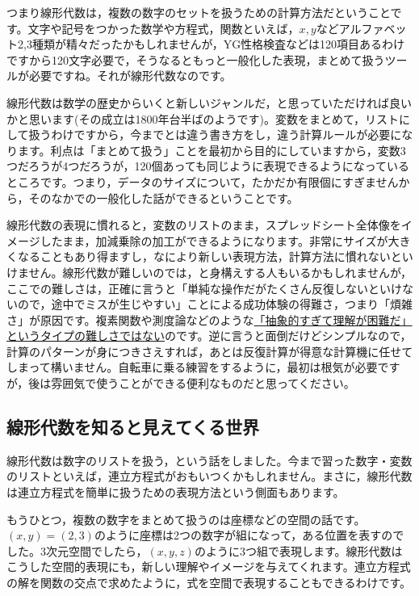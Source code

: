 \documentclass{ltjsbook}
\begin{document}
つまり線形代数は，複数の数字のセットを扱うための計算方法だということです。文字や記号をつかった数学や方程式，関数といえば，$x,y$などアルファベット2,3種類が精々だったかもしれませんが，YG性格検査などは120項目あるわけですから120文字必要で，そうなるともっと一般化した表現，まとめて扱うツールが必要ですね。それが線形代数なのです。

線形代数は数学の歴史からいくと新しいジャンルだ，と思っていただければ良いかと思います(その成立は1800年台半ばのようです)。変数をまとめて，リストにして扱うわけですから，今までとは違う書き方をし，違う計算ルールが必要になります。利点は「まとめて扱う」ことを最初から目的にしていますから，変数3つだろうが4つだろうが，120個あっても同じように表現できるようになっているところです。つまり，データのサイズについて，たかだか有限個にすぎませんから，そのなかでの一般化した話ができるということです。

線形代数の表現に慣れると，変数のリストのまま，スプレッドシート全体像をイメージしたまま，加減乗除の加工ができるようになります。非常にサイズが大きくなることもあり得ますし，なにより新しい表現方法，計算方法に慣れないといけません。線形代数が難しいのでは，と身構えする人もいるかもしれませんが，ここでの難しさは，正確に言うと「単純な操作だがたくさん反復しないといけないので，途中でミスが生じやすい」ことによる成功体験の得難さ，つまり「煩雑さ」が原因です。複素関数や測度論などのような\underline{「抽象的すぎて理解が困難だ」というタイプの難しさではない}のです。逆に言うと面倒だけどシンプルなので，計算のパターンが身につきさえすれば，あとは反復計算が得意な計算機に任せてしまって構いません。自転車に乗る練習をするように，最初は根気が必要ですが，後は雰囲気で使うことができる便利なものだと思ってください。
\subsection{線形代数を知ると見えてくる世界}
線形代数は数字のリストを扱う，という話をしました。今まで習った数字・変数のリストといえば，連立方程式がおもいつくかもしれません。まさに，線形代数は連立方程式を簡単に扱うための表現方法という側面もあります。

もうひとつ，複数の数字をまとめて扱うのは座標などの空間の話です。$(x,y)=(2,3)$のように座標は2つの数字が組になって，ある位置を表すのでした。3次元空間でしたら，$(x,y,z)$のように3つ組で表現します。線形代数はこうした空間的表現にも，新しい理解やイメージを与えてくれます。連立方程式の解を関数の交点で求めたように，式を空間で表現することもできるわけです。
\end{document}
